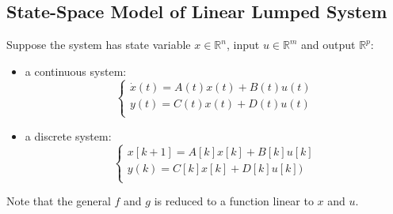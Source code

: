 \documentclass[10pt,a4paper,oneside]{article}
\begin{document}
\subsection{State-Space Model of Linear Lumped System}
Suppose the system has state variable $x \in \mathbb{R}^n$, input $u \in \mathbb{R}^m$ and output $\mathbb{R}^p$:
\begin{itemize}
	\item a continuous system:
	\[
	\left\{
	\begin{array}{ll}
	\dot{x}(t) = A(t)x(t) + B(t)u(t)\\
	y(t) = C(t)x(t) + D(t)u(t)\\
	\end{array}\right.
	\]
	\item a discrete system:
	\[
	\left\{
	\begin{array}{ll}
	x[k+1] = A[k]x[k] + B[k]u[k]\\
	y(k) = C[k]x[k] + D[k]u[k])\\
	\end{array}\right.
	\]
\end{itemize}
Note that the general $f$ and $g$ is reduced to a function linear to $x$ and $u$.
\end{document}
